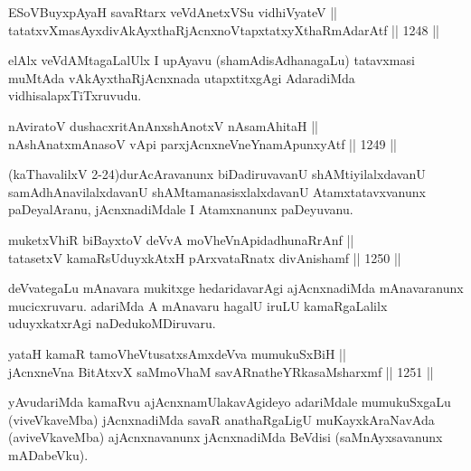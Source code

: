 \begin{shl}
ESoV\s BuyxpAyaH savaRtarx veVdAnetxVSu vidhiVyateV || \\
tatatxvXmasAyxdivAkAyxthaRjAcnxnoVtapxtatxyXthaRmAdarAtf \hfill || 1248 ||  
\end{shl}

\begin{artha}
elAlx veVdAMtagaLalUlx I upAyavu (shamAdisAdhanagaLu) tatavxmasi muMtAda vAkAyxthaRjAcnxnada utapxtitxgAgi AdaradiMda vidhisalapxTiTxruvudu.
\end{artha}


\begin{shl}
nAviratoV dushacxritAnAnxshAnotxV nAsamAhitaH || \\
nAshAnatxmAnasoV vA\s pi parxjAcnxneVneYnamApunxyAtf \hfill || 1249 ||  
\end{shl}

\begin{artha}
(kaThavalilxV 2-24)durAcAravanunx biDadiruvavanU shAMtiyilalxdavanU samAdhAnavilalxdavanU shAMtamanasisxlalxdavanU Atamxtatavxvanunx paDeyalAranu, jAcnxnadiMdale I Atamxnanunx paDeyuvanu.
\end{artha}


\begin{shl}
muketxVhiR biBayxtoV deVvA moVheVnApidadhunaRrAnf || \\
tatasetxV kamaRsUduyxkAtxH pArxvataRnatx divAnishamf \hfill || 1250 ||  
\end{shl}

\begin{artha}
deVvategaLu mAnavara mukitxge hedaridavarAgi ajAcnxnadiMda mAnavaranunx mucicxruvaru. adariMda A mAnavaru hagalU iruLU kamaRgaLalilx uduyxkatxrAgi naDedukoMDiruvaru.
\end{artha}


\begin{shl}
yataH kamaR tamoVheVtusatxsAmxdeVva mumukuSxBiH || \\
jAcnxneVna BitAtxvX saMmoVhaM savARnatheYRkasaMsharxmf \hfill || 1251 ||  
\end{shl}

\begin{artha}
yAvudariMda kamaRvu ajAcnxnamUlakavAgideyo adariMdale mumukuSxgaLu (viveVkaveMba) jAcnxnadiMda savaR anathaRgaLigU muKayxkAraNavAda (aviveVkaveMba) ajAcnxnavanunx jAcnxnadiMda BeVdisi (saMnAyxsavanunx mADabeVku).
\end{artha}

